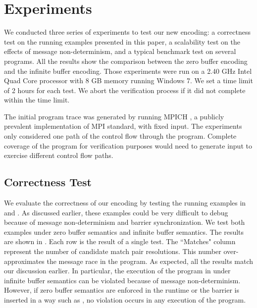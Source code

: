\section{Experiments}
We conducted three series of experiments to test our new encoding: a correctness test on the running examples presented in this paper, a scalability test on the effects of message non-determinism, and a typical benchmark test on several programs. All the results show the comparison between the zero buffer encoding and the infinite buffer encoding.  Those experiments were run on a 2.40 GHz Intel Quad Core processor with 8 GB memory running Windows 7. We set a time limit of 2 hours for each test. We abort the verification process if it did not complete within the time limit. 

The initial program trace was generated by running MPICH \cite{mpich}, a publicly prevalent implementation of MPI standard, with fixed input. The experiments only considered one path of the control flow through the program. Complete coverage of the program for verification purposes would need to generate input to exercise different control flow paths. 

\subsection{Correctness Test}
We evaluate the correctness of our encoding by testing the running examples in  and . As discussed earlier, these examples could be very difficult to debug because of message non-determinism and barrier synchronization. We test both examples under zero buffer semantics and infinite buffer semantics. The results are shown in . Each row is the result of a single test. The ``Matches" column represent the number of candidate match pair resolutions.  This number over-approximates the message race in the program. As expected, all the results match our discussion earlier. In particular, the execution of the program in  under infinite buffer semantics can be violated because of message non-determinism. However, if zero buffer semantics are enforced in the runtime or the barrier is inserted in a way such as , no violation occurs in any execution of the program. 

